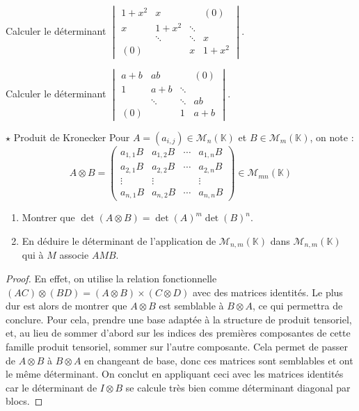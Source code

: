 \documentclass[french,a4paper]{article}
\newcommand{\K}{\mathbb{K}}
\theoremstyle{plain}
\theoremstyle{definition}
\theoremstyle{remark}
\begin{document}
\begin{ex}{}
	Calculer le déterminant $\displaystyle\begin{vmatrix}
		1+x^2&x&&(0)\\
		x&1+x^2&\ddots&\\
		&\ddots&\ddots&x\\
		(0)&&x&1+x^2
	\end{vmatrix}$.
\end{ex}

\begin{ex}{}
	Calculer le déterminant $\displaystyle\begin{vmatrix}
		a+b&ab&&(0)\\
		1&a+b&\ddots&\\
		&\ddots&\ddots&ab\\
		(0)&&1&a+b
	\end{vmatrix}$.
\end{ex}

\begin{ex}{$\star$ Produit de Kronecker} Pour $A=(a_{i,j})\in\mathcal{M}_n(\K)$ et $B\in\mathcal{M}_m(\K)$, on note : $$A\otimes B=\begin{pmatrix}
		a_{1,1}B&a_{1,2}B&\cdots&a_{1,n}B\\
		a_{2,1}B&a_{2,2}B&\cdots&a_{2,n}B\\
		\vdots&\vdots&&\vdots\\
		a_{n,1}B&a_{n,2}B&\cdots&a_{n,n}B
	\end{pmatrix}\in\mathcal{M}_{mn}(\K)$$
	\begin{enumerate}
		\item Montrer que $\det(A\otimes B)=\det(A)^m\det(B)^n$.
		\item En déduire le déterminant de l'application de $\mathcal{M}_{n,m}(\K)$ dans $\mathcal{M}_{n,m}(\K)$ qui à $M$ associe $AMB$.
	\end{enumerate}
\end{ex}\begin{proof}
	En effet, on utilise la relation fonctionnelle $(AC)\otimes(BD)=(A\otimes B)\times(C\otimes D)$ avec des matrices identités. Le plus dur est alors de montrer que $A\otimes B$ est semblable à $B\otimes A$, ce qui permettra de conclure. Pour cela, prendre une base adaptée à la structure de produit tensoriel, et, au lieu de sommer d'abord sur les indices des premières composantes de cette famille produit tensoriel, sommer sur l'autre composante. Cela permet de passer de $A\otimes B$ à $B\otimes A$ en changeant de base, donc ces matrices sont semblables et ont le même déterminant. On conclut en appliquant ceci avec les matrices identités car le déterminant de $I\otimes B$ se calcule très bien comme déterminant diagonal par blocs.
\end{proof}
\end{document}
